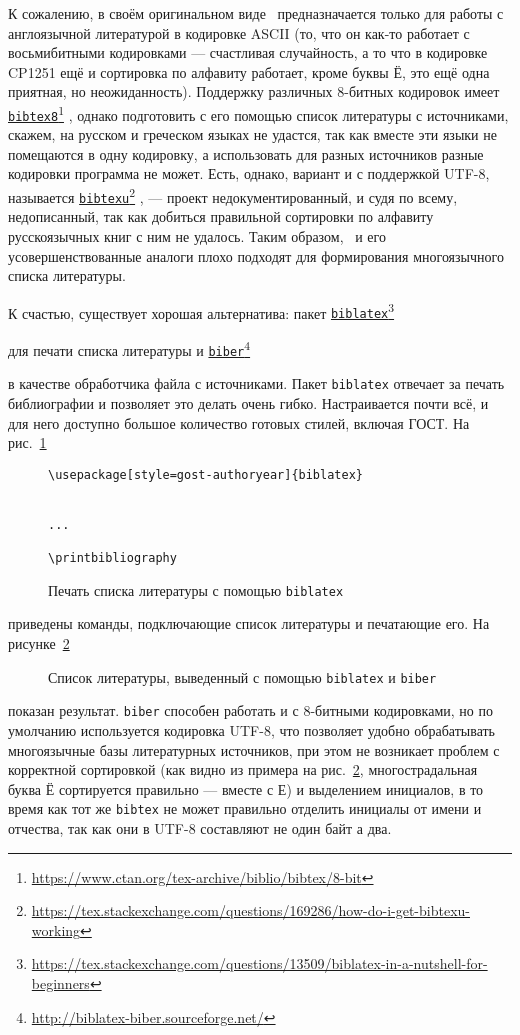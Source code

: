 \documentclass[a4paper,12pt]{article}
\let\orighref=\href
\renewcommand\href[2]{%
  \orighref{#1}{#2}\footnote{\url{#1}}%
}
\begin{document}
К сожалению, в своём оригинальном виде \BibTeX\ предназначается только
для работы с англоязычной литературой в кодировке ASCII (то, что
он как-то работает с восьмибитными кодировками --- счастливая случайность,
а то что в кодировке CP1251 ещё и сортировка по алфавиту работает,
кроме буквы Ё, это ещё одна приятная, но неожиданность). Поддержку различных
8-битных кодировок имеет
\href{https://www.ctan.org/tex-archive/biblio/bibtex/8-bit}{\texttt{bibtex8}},
однако подготовить с его помощью
список литературы с источниками, скажем, на русском и греческом языках
не удастся, так как вместе эти языки не помещаются в одну кодировку, а
использовать для разных источников разные кодировки программа не может.
Есть, однако, вариант и с поддержкой UTF-8, называется
\href{https://tex.stackexchange.com/questions/169286/how-do-i-get-bibtexu-working}{\texttt{bibtexu}},
--- проект недокументированный, и судя по всему, недописанный, так как
добиться правильной сортировки по алфавиту русскоязычных книг с ним
не удалось. Таким образом, \BibTeX\ и его усовершенствованные аналоги
плохо подходят для формирования многоязычного списка литературы.

К счастью, существует хорошая альтернатива: пакет
\href{https://tex.stackexchange.com/questions/13509/biblatex-in-a-nutshell-for-beginners}{\texttt{biblatex}}
для печати списка литературы и
\href{http://biblatex-biber.sourceforge.net/}{\texttt{biber}}
в качестве обработчика файла с источниками.
Пакет \texttt{biblatex} отвечает за печать библиографии и позволяет
это делать очень гибко. Настраивается почти всё, и для него доступно большое
количество готовых стилей, включая ГОСТ. На рис.~\ref{biblatex1}
\begin{figure}[tp]
\footnotesize
\begin{verbatim}
\usepackage[style=gost-authoryear]{biblatex}


...

\printbibliography
\end{verbatim}
\caption{Печать списка литературы с помощью \texttt{biblatex}}\label{biblatex1}
\end{figure}
приведены
команды, подключающие список литературы и печатающие его. На рисунке~\ref{biblatex2}%
\nocite{yolkin1997,esin1950,eliseeva2010,chebyshev1859}%
%
%
\begin{figure}[tp]
\centering
\small
\printbibliography
\caption{Список литературы, выведенный с помощью \texttt{biblatex} и \texttt{biber}}\label{biblatex2}
\end{figure}
показан результат.
\texttt{biber} способен работать и с 8-битными кодировками, но по умолчанию
используется кодировка UTF-8, что позволяет удобно обрабатывать многоязычные
базы литературных источников, при этом не возникает проблем с корректной сортировкой
(как видно из примера на рис.~\ref{biblatex2}, многострадальная буква Ё
сортируется правильно --- вместе с Е) и выделением инициалов, в то время как
тот же \texttt{bibtex} не может правильно отделить инициалы от имени и отчества,
так как они в UTF-8 составляют не один байт а два.
\end{document}
